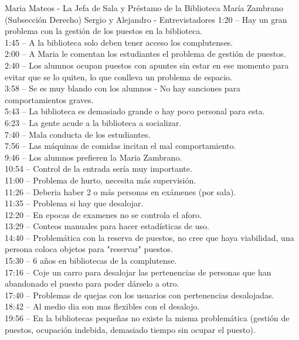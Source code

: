 \documentclass[12pt]{article}
\begin{document}
Maria Mateos - La Jefa de Sala y Préstamo de la Biblioteca María Zambrano (Subsección Derecho)
Sergio y Alejandro - Entrevistadores  
1:20 – Hay un gran problema con la gestión de los puestos en la biblioteca.\\
1:45 – A la biblioteca solo deben tener acceso los complutenses.\\
2:00 – A Maria le comentan los estudiantes el problema de gestión de puestos.\\
2:40 – Los alumnos ocupan puestos con apuntes sin estar en ese momento para evitar que se lo quiten, lo que conlleva un problema de espacio.\\
3:58 – Se es muy blando con los alumnos - No hay sanciones para comportamientos graves.\\
5:43 – La biblioteca es demasiado grande o hay poco personal para esta.\\
6:23 – La gente acude a la biblioteca a socializar.\\
7:40 – Mala conducta de los estudiantes.\\
7:56 – Las máquinas de comidas incitan el mal comportamiento.\\
9:46 – Los alumnos prefieren la Maria Zambrano.\\
10:54 – Control de la entrada sería muy importante.\\
11:00 – Problema de hurto, necesita más supervisión.\\
11:26 – Deberia haber 2 o más personas en  exámenes (por sala).\\
11:35 – Problema si hay que desalojar.\\
12:20 – En epocas de examenes no se controla el aforo.\\
13:29 – Conteos manuales para hacer estadísticas de uso.\\
14:40 – Problemática con la reserva de puestos, no cree que haya viabilidad, una persona coloca objetos para "reservar" puestos.\\
15:30 – 6 años en bibliotecas de la complutense.\\
17:16 – Coje un carro para desalojar las pertenencias de personas que han abandonado el puesto para poder dárselo a otro.\\
17:40 – Problemas de quejas con los usuarios con pertenencias desalojadas.\\
18:42 – Al medio dia son mas flexibles con el desalojo.\\
19:56 – En la bibliotecas pequeñas no existe la misma problemática (gestión de puestos, ocupación indebida, demasiado tiempo sin ocupar el puesto).\\
\end{document}
